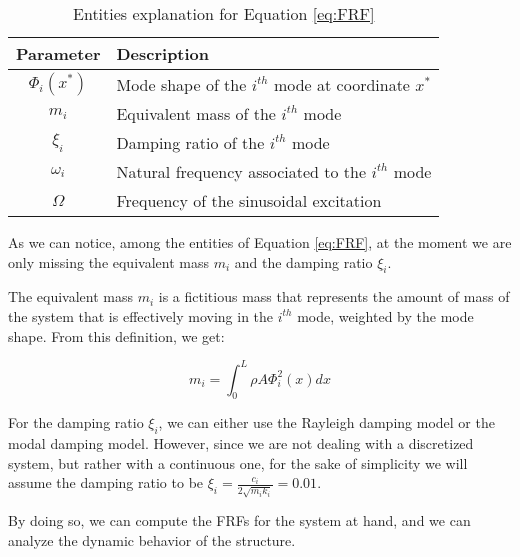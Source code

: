 \begin{table}[H]
    \centering
    \begin{tabular}{cl}
        \hline
        Parameter     & Description                                         \\
        \hline
        $\Phi_i(x^*)$ & Mode shape of the $i^{th}$ mode at coordinate $x^*$ \\
        $m_i$         & Equivalent mass of the $i^{th}$ mode                \\
        $\xi_i$       & Damping ratio of the $i^{th}$ mode                  \\
        $\omega_i$    & Natural frequency associated to the $i^{th}$ mode   \\
        $\Omega$      & Frequency of the sinusoidal excitation              \\
        \hline
    \end{tabular}
    \caption{Entities explanation for Equation \ref{eq:FRF}}
    \label{tab:FRF_entities}
\end{table}

As we can notice, among the entities of Equation \ref{eq:FRF}, at the moment we are only missing the equivalent mass $m_i$ and the damping ratio $\xi_i$.

The equivalent mass $m_i$ is a fictitious mass that represents the amount of mass of the system that is effectively moving in the $i^{th}$ mode, weighted by the mode shape.
From this definition, we get:

\begin{equation}
    m_i = \int_{0}^{L} \rho A \Phi_i^2(x) dx
\end{equation}

For the damping ratio $\xi_i$, we can either use the Rayleigh damping model or the modal damping model.
However, since we are not dealing with a discretized system, but rather with a continuous one, for the sake of simplicity we will assume the damping ratio to be $\xi_i = \frac{c_i}{2 \sqrt{m_i k_i}} = 0.01$.

By doing so, we can compute the FRFs for the system at hand, and we can analyze the dynamic behavior of the structure.


